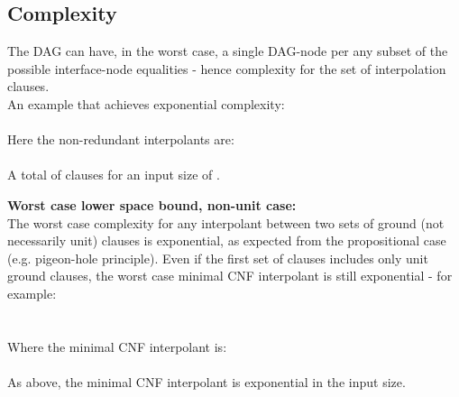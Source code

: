 \subsection*{Complexity}
The DAG can have, in the worst case, a single DAG-node per any subset of the possible interface-node equalities - hence  complexity for the set of interpolation clauses.\\
An example that achieves exponential complexity:\\
\\
Here the non-redundant interpolants are:\\
\\
A total of  clauses for an input size of .

\textbf{Worst case lower space bound, non-unit case:}\\
The worst case complexity for any interpolant between two sets of ground (not necessarily unit) clauses is exponential, as expected from the propositional case (e.g. pigeon-hole principle).
Even if the first set of clauses includes only unit ground clauses, the worst case minimal CNF interpolant is still exponential - for example:\\
\\
\\
Where the minimal CNF interpolant is:\\
\\
As above, the minimal CNF interpolant is exponential in the input size.

